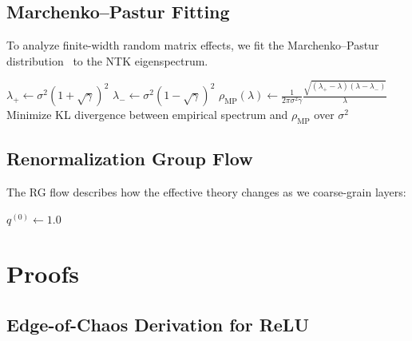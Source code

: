 \documentclass[10pt]{article}
\theoremstyle{definition}
\begin{document}
\subsection{Marchenko--Pastur Fitting}
\label{app:alg-mp}

To analyze finite-width random matrix effects, we fit the Marchenko--Pastur distribution~\citep{marchenko1967distribution} to the NTK eigenspectrum.

\begin{algorithm}[H]
\SetAlgoLined
{}
$\lambda_+ \leftarrow \sigma^2 (1 + \sqrt{\gamma})^2$\;
$\lambda_- \leftarrow \sigma^2 (1 - \sqrt{\gamma})^2$\;
$\rho_{\text{MP}}(\lambda) \leftarrow \frac{1}{2\pi \sigma^2 \gamma} \frac{\sqrt{(\lambda_+ - \lambda)(\lambda - \lambda_-)}}{\lambda}$\;
Minimize KL divergence between empirical spectrum and $\rho_{\text{MP}}$ over $\sigma^2$\;
\caption{Marchenko--Pastur Distribution Fitting}
\label{alg:mp}
\end{algorithm}

\subsection{Renormalization Group Flow}
\label{app:alg-rg}

The RG flow describes how the effective theory changes as we coarse-grain layers:

\begin{algorithm}[H]
\SetAlgoLined
{}
$q^{(0)} \leftarrow 1.0$\;
\caption{Renormalization Group Flow Computation}
\label{alg:rg}
\end{algorithm}

\section{Proofs}
\label{app:proofs}

\subsection{Edge-of-Chaos Derivation for ReLU}
\label{app:proof-eoc}
\end{document}
